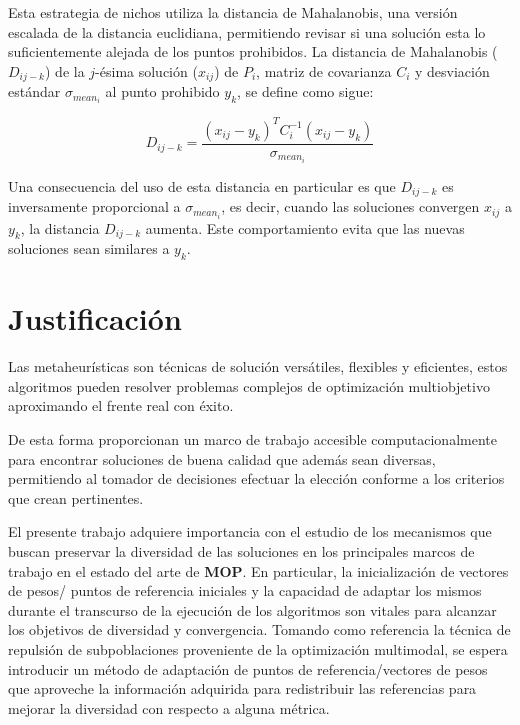 \documentclass[letterpaper,10pt]{article}
\begin{document}
Esta estrategia de nichos utiliza la distancia de Mahalanobis\cite{mahalanobis1936generalised}, una versión escalada de la distancia euclidiana, permitiendo revisar si una solución esta lo suficientemente
alejada de los puntos prohibidos. La distancia de Mahalanobis ($D_{ij-k}$) de la $j$-ésima solución ($x_{ij}$) de $P_i$, matriz de covarianza $C_i$ y desviación estándar $\sigma_{mean_i}$ al punto prohibido
$y_k$, se define como sigue:

$$D_{ij-k} = \frac{(x_{ij}-y_k)^T C^{-1}_i (x_{ij}-y_k)}{\sigma_{mean_i}}$$

Una consecuencia del uso de esta distancia en particular es que $D_{ij-k}$ es inversamente proporcional a $\sigma_{mean_i}$, es decir, cuando las soluciones convergen $x_{ij}$ a $y_k$,
la distancia $D_{ij-k}$ aumenta. Este comportamiento evita que las nuevas soluciones sean similares a $y_k$.



\section{Justificación}

Las metaheurísticas son técnicas de solución versátiles, flexibles y eficientes, estos algoritmos pueden resolver problemas complejos de optimización multiobjetivo \cite{coello1999comprehensive} aproximando el frente real con éxito.
\newline

De esta forma proporcionan un marco de trabajo accesible computacionalmente para encontrar soluciones de buena calidad que además sean diversas, permitiendo al tomador de decisiones efectuar la elección conforme a los criterios que crean pertinentes.
\newline

El presente trabajo adquiere importancia con el estudio de los mecanismos que buscan preservar la diversidad de las soluciones en los principales marcos de trabajo en el estado del arte de \textbf{MOP}. En particular,
la inicialización de vectores de pesos/ puntos de referencia iniciales y la capacidad de adaptar los mismos durante el transcurso de la ejecución de los algoritmos son vitales para alcanzar los objetivos de diversidad y convergencia. 
Tomando como referencia la técnica de repulsión de subpoblaciones proveniente de la optimización multimodal\cite{doi:10.1162/EVCOa00182}, se espera introducir un método de adaptación de puntos de referencia/vectores de pesos que aproveche la información adquirida para redistribuir las referencias para mejorar la diversidad con respecto a alguna métrica.
\end{document}
